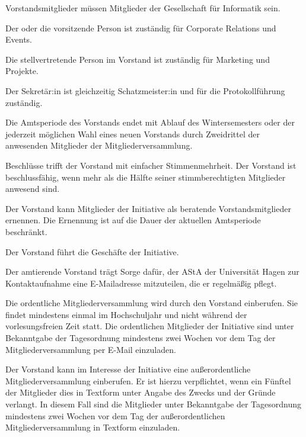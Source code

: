 \begin{contract}
Vorstandsmitglieder müssen Mitglieder der Gesellschaft für Informatik sein.

Der oder die vorsitzende Person ist zuständig für Corporate Relations und Events.

Die stellvertretende Person im Vorstand ist zuständig für Marketing und Projekte.

Der Sekretär:in ist gleichzeitig Schatzmeister:in und für die Protokollführung zuständig.

Die Amtsperiode des Vorstands endet mit Ablauf des Wintersemesters oder der jederzeit möglichen Wahl eines neuen Vorstands durch Zweidrittel der anwesenden Mitglieder der Mitgliederversammlung. \label{sec:vorstand-VorzeitigeAbwahl}

Beschlüsse trifft der Vorstand mit einfacher Stimmenmehrheit. Der Vorstand ist beschlussfähig, wenn mehr als die Hälfte seiner stimmberechtigten Mitglieder anwesend sind.

Der Vorstand kann Mitglieder der Initiative als beratende Vorstandsmitglieder ernennen. Die Ernennung ist auf die Dauer der aktuellen Amtsperiode beschränkt.


\label{sec:geschäftsbereichVorstand}

Der Vorstand führt die Geschäfte der Initiative.

Der amtierende Vorstand trägt Sorge dafür, der AStA der Universität Hagen zur Kontaktaufnahme eine E-Mailadresse mitzuteilen, die er regelmäßig pflegt.


\label{sec:mitgliederversammlung}

Die ordentliche Mitgliederversammlung wird durch den Vorstand einberufen. Sie findet mindestens einmal im Hochschuljahr und nicht während der vorlesungsfreien Zeit statt. Die ordentlichen Mitglieder der Initiative sind unter Bekanntgabe der Tagesordnung mindestens zwei Wochen vor dem Tag der Mitgliederversammlung per E-Mail einzuladen.

Der Vorstand kann im Interesse der Initiative eine außerordentliche Mitgliederversammlung einberufen. Er ist hierzu verpflichtet, wenn ein Fünftel der Mitglieder dies in Textform unter Angabe des Zwecks und der Gründe verlangt. In diesem Fall sind die Mitglieder unter Bekanntgabe der Tagesordnung mindestens zwei Wochen vor dem Tag der außerordentlichen Mitgliederversammlung in Textform einzuladen.


\label{sec:aufgabenMitgliederversammlung}


\end{contract}
